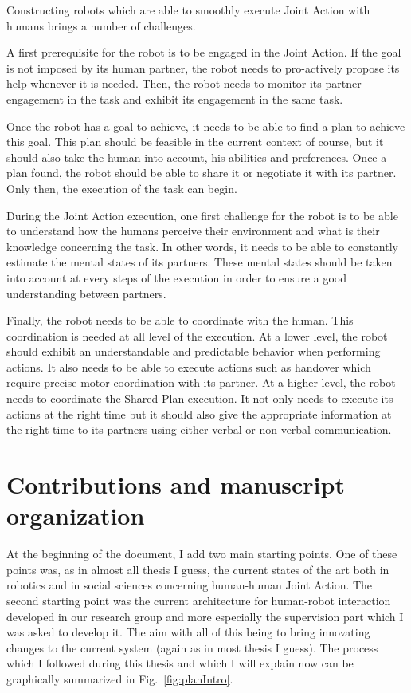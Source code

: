 \documentclass[english,a4paper,11pt,twoside]{StyleThese}
\begin{document}
Constructing robots which are able to smoothly execute Joint Action with humans brings a number of challenges. 

A first prerequisite for the robot is to be engaged in the Joint Action. If the goal is not imposed by its human partner, the robot needs to pro-actively propose its help whenever it is needed. Then, the robot needs to monitor its partner engagement in the task and exhibit its engagement in the same task.

Once the robot has a goal to achieve, it needs to be able to find a plan to achieve this goal. This plan should be feasible in the current context of course, but it should also take the human into account, his abilities and preferences. Once a plan found, the robot should be able to share it or negotiate it with its partner. Only then, the execution of the task can begin.

During the Joint Action execution, one first challenge for the robot is to be able to understand how the humans perceive their environment and what is their knowledge concerning the task. In other words, it needs to be able to constantly estimate the mental states of its partners. These mental states should be taken into account at every steps of the execution in order to ensure a good understanding between partners.

Finally, the robot needs to be able to coordinate with the human. This coordination is needed at all level of the execution. At a lower level, the robot should exhibit an understandable and predictable behavior when performing actions. It also needs to be able to execute actions such as handover which require precise motor coordination with its partner. At a higher level, the robot needs to coordinate the Shared Plan execution. It not only needs to execute its actions at the right time but it should also give the appropriate information at the right time to its partners using either verbal or non-verbal communication.

\section*{Contributions and manuscript organization}

At the beginning of the document, I add two main starting points. One of these points was, as in almost all thesis I guess, the current states of the art both in robotics and in social sciences concerning human-human Joint Action. The second starting point was the current architecture for human-robot interaction developed in our research group and more especially the supervision part which I was asked to develop it. The aim with all of this being to bring innovating changes to the current system (again as in most thesis I guess). The process which I followed during this thesis and which I will explain now can be graphically summarized in Fig.~\ref{fig:planIntro}.
\end{document}
